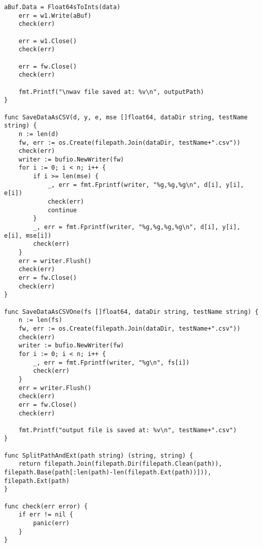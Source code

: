 \begin{lstlisting}[caption=filehandler.go,label=filehandler.go]
	aBuf.Data = Float64sToInts(data)
	err = w1.Write(aBuf)
	check(err)

	err = w1.Close()
	check(err)

	err = fw.Close()
	check(err)

	fmt.Printf("\nwav file saved at: %v\n", outputPath)
}

func SaveDataAsCSV(d, y, e, mse []float64, dataDir string, testName string) {
	n := len(d)
	fw, err := os.Create(filepath.Join(dataDir, testName+".csv"))
	check(err)
	writer := bufio.NewWriter(fw)
	for i := 0; i < n; i++ {
		if i >= len(mse) {
			_, err = fmt.Fprintf(writer, "%g,%g,%g\n", d[i], y[i], e[i])
			check(err)
			continue
		}
		_, err = fmt.Fprintf(writer, "%g,%g,%g,%g\n", d[i], y[i], e[i], mse[i])
		check(err)
	}
	err = writer.Flush()
	check(err)
	err = fw.Close()
	check(err)
}

func SaveDataAsCSVOne(fs []float64, dataDir string, testName string) {
	n := len(fs)
	fw, err := os.Create(filepath.Join(dataDir, testName+".csv"))
	check(err)
	writer := bufio.NewWriter(fw)
	for i := 0; i < n; i++ {
		_, err = fmt.Fprintf(writer, "%g\n", fs[i])
		check(err)
	}
	err = writer.Flush()
	check(err)
	err = fw.Close()
	check(err)

	fmt.Printf("output file is saved at: %v\n", testName+".csv")
}

func SplitPathAndExt(path string) (string, string) {
	return filepath.Join(filepath.Dir(filepath.Clean(path)), filepath.Base(path[:len(path)-len(filepath.Ext(path))])), filepath.Ext(path)
}

func check(err error) {
	if err != nil {
		panic(err)
	}
}
\end{lstlisting}

